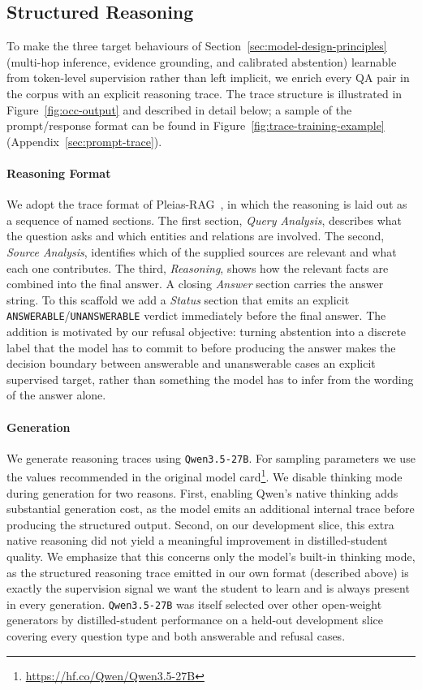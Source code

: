 \subsection{Structured Reasoning}
\label{sec:synth-traces}

To make the three target behaviours of Section~\ref{sec:model-design-principles} (multi-hop inference, evidence grounding, and calibrated abstention) learnable from token-level supervision rather than left implicit, we enrich every QA pair in the corpus with an explicit reasoning trace. The trace structure is illustrated in Figure~\ref{fig:occ-output} and described in detail below; a sample of the prompt/response format can be found in Figure~\ref{fig:trace-training-example} (Appendix~\ref{sec:prompt-trace}).

\paragraph{Reasoning Format}
We adopt the trace format of Pleias-RAG~\citep{pleias}, in which the reasoning is laid out as a sequence of named sections. The first section, \emph{Query Analysis}, describes what the question asks and which entities and relations are involved. The second, \emph{Source Analysis}, identifies which of the supplied sources are relevant and what each one contributes. The third, \emph{Reasoning}, shows how the relevant facts are combined into the final answer. A closing \emph{Answer} section carries the answer string. To this scaffold we add a \emph{Status} section that emits an explicit \texttt{ANSWERABLE}/\texttt{UNANSWERABLE} verdict immediately before the final answer. The addition is motivated by our refusal objective: turning abstention into a discrete label that the model has to commit to before producing the answer makes the decision boundary between answerable and unanswerable cases an explicit supervised target, rather than something the model has to infer from the wording of the answer alone.

\paragraph{Generation}
We generate reasoning traces using \texttt{Qwen3.5-27B}. For sampling parameters we use the values recommended in the original model card\footnote{\url{https://hf.co/Qwen/Qwen3.5-27B}}. We disable thinking mode during generation for two reasons. First, enabling Qwen's native thinking adds substantial generation cost, as the model emits an additional internal trace before producing the structured output. Second, on our development slice, this extra native reasoning did not yield a meaningful improvement in distilled-student quality. We emphasize that this concerns only the model's built-in thinking mode, as the structured reasoning trace emitted in our own format (described above) is exactly the supervision signal we want the student to learn and is always present in every generation. \texttt{Qwen3.5-27B} was itself selected over other open-weight generators by distilled-student performance on a held-out development slice covering every question type and both answerable and refusal cases.

